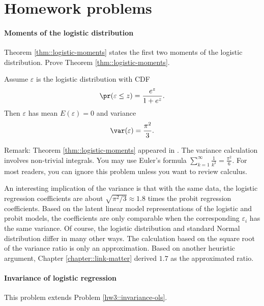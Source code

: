 \section{Homework problems}




\paragraph{Moments of the logistic distribution}
\label{hw17::logistic-moments}

Theorem \ref{thm::logistic-moments} states the first two moments of the logistic distribution. Prove Theorem \ref{thm::logistic-moments}.

\begin{theorem}\label{thm::logistic-moments}
Assume $\varepsilon$ is the logistic distribution with CDF
$$
\pr(\varepsilon \leq z) = \frac{e^z}{1 + e^z}.
$$
Then $\varepsilon$ has mean $E(\varepsilon) = 0$ and variance
$$
\var(\varepsilon) = \frac{\pi^2}{3}. 
$$
\end{theorem}


Remark: Theorem \ref{thm::logistic-moments} appeared in \citet{decani1986note}. 
The variance calculation involves non-trivial integrals. 
You may use Euler's formula $\sum_{k=1}^{\infty} \frac{1}{k^2} = \frac{\pi^2}{6}.$ For most readers, you can ignore this problem unless you want to review calculus. 


An interesting implication of the variance is that with the same data, the logistic regression coefficients are about $\sqrt{\pi^2/3} \approx 1.8$ times the probit regression coefficients. Based on the latent linear model representations of the logistic and probit models,  the coefficients are only comparable when the corresponding $\varepsilon_i$ has the same variance. Of course, the logistic distribution and standard Normal distribution differ in many other ways. The calculation based on the square root of the variance ratio is only an approximation. Based on another heuristic argument, Chapter \ref{chapter::link-matter} derived $1.7$ as the approximated ratio. 

 

\paragraph{Invariance of logistic regression}
\label{hw17::invariance-logistic}

This problem extends Problem \ref{hw3::invariance-ols}. 

